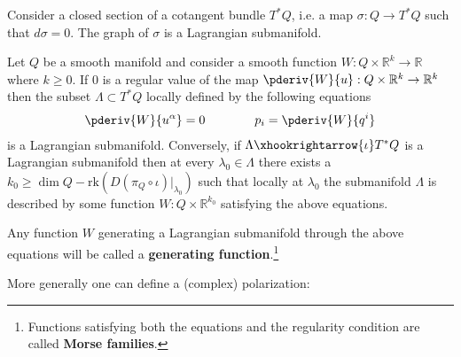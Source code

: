 	\begin{example}\label{diff:closed_section_submanifold}
		Consider a closed section of a cotangent bundle $T^*Q$, i.e. a map $\sigma:Q\rightarrow T^*Q$ such that $d\sigma=0$. The graph of $\sigma$ is a Lagrangian submanifold.
	\end{example}
	
	\begin{theorem}
		Let $Q$ be a smooth manifold and consider a smooth function $W:Q\times\mathbb{R}^k\rightarrow\mathbb{R}$ where $k\geq 0$. If 0 is a regular value of the map $\pderiv{W}{u}:Q\times\mathbb{R}^k\rightarrow\mathbb{R}^k$ then the subset $\Lambda\subset T^*Q$ locally defined by the following equations
		\begin{gather}
			\pderiv{W}{u^\alpha} = 0\qquad\qquad p_i=\pderiv{W}{q^i}
		\end{gather}
		is a Lagrangian submanifold. Conversely, if $\Lambda\xhookrightarrow{\iota}T^*Q$ is a Lagrangian submanifold then at every $\lambda_0\in\Lambda$ there exists a $k_0\geq\dim Q - \text{rk}\left(D(\pi_Q\circ\iota)|_{\lambda_0}\right)$ such that locally at $\lambda_0$ the submanifold $\Lambda$ is described by some function $W:Q\times\mathbb{R}^{k_0}$ satisfying the above equations.
	\end{theorem}
	Any function $W$ generating a Lagrangian submanifold through the above equations will be called a \textbf{generating function}.\footnote{Functions satisfying both the equations and the regularity condition are called \textbf{Morse families}.}
	
	More generally one can define a (complex) polarization:
	
